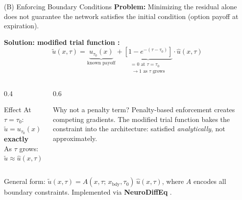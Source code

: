 \begin{frame}{(B) Enforcing Boundary Conditions}
  \textbf{Problem:} Minimizing the residual alone does not guarantee the network satisfies the initial condition (option payoff at expiration).

  \vspace{0.4em}
  \textbf{Solution: modified trial function \cite{lagaris1998, chen2020}:}
  \[
    \tilde{u}(x, \tau) = \underbrace{u_{\tau_0}(x)}_{\text{known payoff}} +
    \underbrace{\left[1 - e^{-(\tau - \tau_0)}\right]}_{\substack{\text{= 0 at } \tau = \tau_0 \\ \to 1 \text{ as } \tau \text{ grows}}} \cdot \hat{u}(x, \tau)
  \]
  \vspace{-20pt}
  \begin{columns}[T]
    \begin{column}{0.4\textwidth}
      \begin{exampleblock}{Effect}
        At $\tau = \tau_0$:\quad $\tilde{u} = u_{\tau_0}(x)$ \textbf{exactly}\\[0.3em]
        As $\tau$ grows:\quad $\tilde{u} \approx \hat{u}(x,\tau)$
      \end{exampleblock}
    \end{column}
    \begin{column}{0.6\textwidth}
      \begin{alertblock}{Why not a penalty term?}
        \small Penalty-based enforcement creates competing gradients. The modified trial function bakes the constraint into the architecture: satisfied \emph{analytically}, not approximately.
      \end{alertblock}
    \end{column}
  \end{columns}

  \vspace{0.2em}
  \footnotesize
  General form: $\tilde{u}(x,\tau) = A(x,\tau;\,x_\text{bdy},\tau_0)\,\hat{u}(x,\tau)$, where $A$ encodes all boundary constraints. Implemented via \textbf{NeuroDiffEq} \cite{chen2020}.
\end{frame}
